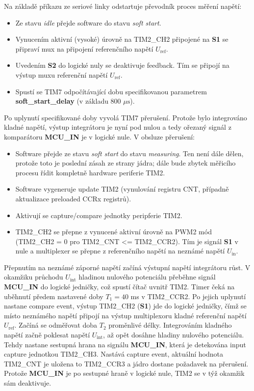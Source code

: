 \documentclass[twoside]{article}
\begin{document}
Na základě příkazu ze seriové linky odstartuje převodník proces měření napětí:
\begin{itemize}
    \item Ze stavu \textit{idle} přejde software do stavu \textit{soft start}.
    \item Vynucením aktivní (vysoké) úrovně na TIM2\_CH2 připojené na \textbf{S1} se připraví mux na připojení referenčního napětí $U_{\text{ref}}$.
    \item Uvedením \textbf{S2} do logické nuly se deaktivuje feedback. Tím se připojí na výstup muxu referenční napětí $U_{\text{ref}}$.
    \item Spustí se TIM7 odpočítávající dobu specifikovanou parametrem \textbf{soft\_start\_delay} (v základu 800 $\mu\text{s}$).
\end{itemize}

Po uplynutí specifikované doby vyvolá TIM7 přerušení. Protože bylo integrováno kladné napětí, výstup integrátoru je nyní pod nulou a tedy ořezaný signál z komparátoru
\textbf{MCU\_IN} je v logické nule. V obsluze přerušení:
\begin{itemize}
    \item Software přejde ze stavu \textit{soft start} do stavu \textit{measuring}.
    Ten není dále dělen, protože toto je poslední zásah ze strany jádra; dále bude zbytek měřicího procesu řídit kompletně hardware periferie TIM2.
    \item Software vygeneruje update TIM2 (vynulování registru CNT, případně aktualizace preloaded CCRx registrů).
    \item Aktivují se capture/compare jednotky peripferie TIM2.
    \item TIM2\_CH2 se přepne z vynucené aktivní úrovně na PWM2 mód (TIM2\_CH2 = 0 pro TIM2\_CNT <= TIM2\_CCR2).
    Tím je signál \textbf{S1} v nule a multiplexer se přepne z referenčního napětí na neznámé napětí $U_{\text{in}}$.
\end{itemize}
Přepnutím na neznámé záporné napětí začíná výstupní napětí integrátoru růst. V okamžiku průchodu $U_{\text{int}}$ hladinou nulového potenciálu přeběhne signál \textbf{MCU\_IN}
do logické jedničky, což spustí čítač uvnitř TIM2. Timer čeká na uběhnutí předem nastavené doby $T_1 = 40$ ms v TIM2\_CCR2. Po jejich uplynutí nastane compare event,
výstup TIM2\_CH2 (\textbf{S1}) jde do logické jedničky, čímž se místo neznámého napětí připojí na výstup multiplexoru kladné referenční napětí $U_{\text{ref}}$.
Začíná se odměřovat doba $T_2$ proměnlivé délky.
Integrováním kladného napětí začně poklesat napětí $U_{\text{int}}$, až opět dosáhne hladiny nulového potenciálu. Tehdy nastane sestupná hrana na signálu \textbf{MCU\_IN}, která
je detekována input capture jednotkou TIM2\_CH3. Nastává capture event, aktuální hodnota TIM2\_CNT je uložena to TIM2\_CCR3 a jádro dostane požadavek na přerušení.
Protože \textbf{MCU\_IN} je po sestupné hraně v logické nule, TIM2 se v týž okamžik sám deaktivuje.
\end{document}
